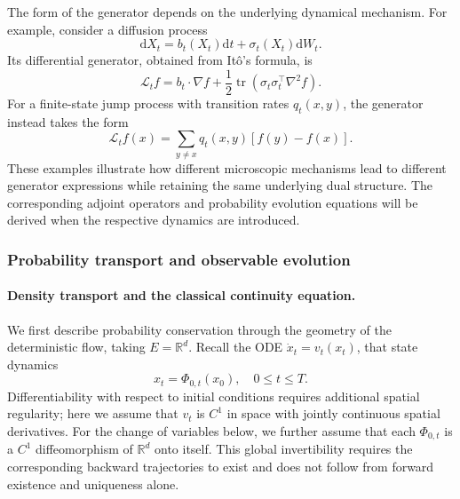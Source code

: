 \documentclass[12pt,a4paper,oneside]{book}
\begin{document}
The form of the generator depends on the underlying dynamical mechanism. For example, consider a diffusion process
\begin{equation*}
    \mathrm dX_t = b_t(X_t)\mathrm dt+\sigma_t(X_t)\mathrm dW_t.
\end{equation*}
Its differential generator, obtained from It\^o's formula, is
\begin{equation*}
    \mathcal L_t f = b_t\cdot\nabla f + \frac12\operatorname{tr}
        \left(
            \sigma_t\sigma_t^\top\nabla^2f
        \right).
\end{equation*}
For a finite-state jump process with transition rates $q_t(x,y)$, the generator instead takes the form
\begin{equation*}
    \mathcal L_t f(x) = \sum_{y\neq x}q_t(x,y)[f(y)-f(x)].
\end{equation*}
These examples illustrate how different microscopic mechanisms lead to different generator expressions while retaining the
same underlying dual structure. The corresponding adjoint operators and probability evolution equations will be derived
when the respective dynamics are introduced.


\subsubsection{Probability transport and observable evolution}
\label{subsubsec:classical-probability-transport}

\paragraph{Density transport and the classical continuity equation.}
We first describe probability conservation through the geometry of the deterministic flow, taking $E=\mathbb R^d$. Recall 
the ODE $\dot x_t=v_t(x_t)$, that state dynamics
\begin{equation*}
    x_t=\Phi_{0,t}(x_0), \quad 0\leq t\leq T.
\end{equation*}
Differentiability with respect to initial conditions requires additional spatial regularity; here we assume that $v_t$ is 
$C^1$ in space with jointly continuous spatial derivatives. For the change of variables below, we further assume that each 
$\Phi_{0,t}$ is a $C^1$ diffeomorphism of $\mathbb R^d$ onto itself. This global invertibility requires the corresponding 
backward trajectories to exist and does not follow from forward existence and uniqueness alone.
\end{document}
